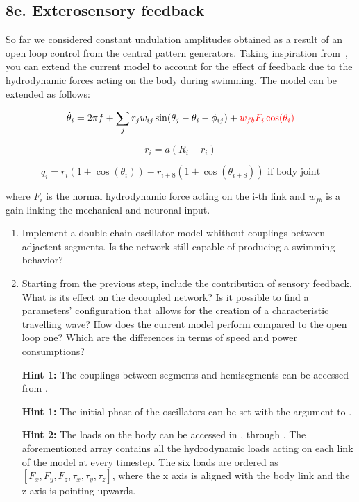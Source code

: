 \documentclass{cmc}
\begin{document}
\subsection*{8e. Exterosensory feedback}
\label{sec:exterosensory-feedback}

So far we considered constant undulation amplitudes obtained as a result
of an open loop control from the central pattern generators.
Taking inspiration from~\cite{thandiackal2021emergence}, you can extend the
current model to account for the effect of feedback due to the
hydrodynamic forces acting on the body during swimming.
The model can be extended as follows:

\begin{equation}
  \label{eq:dphase_fb}
  \dot{\theta}_i = 2 \pi f + \sum_j r_j w_{ij} \sin(\theta_j - \theta_i - \phi_{ij})
                  + \textcolor{red}{w_{fb} F_{i} \cos(\theta_i)}
\end{equation}

\begin{equation}
  \label{eq:dr_fb}
  \dot{r}_i = a (R_i - r_i)
\end{equation}

\begin{equation}
  \label{eq:output_fb}
  q_i = r_i(1 + \cos(\theta_i)) - r_{i+8}(1 + \cos(\theta_{i+8})) \text{ if body joint}
\end{equation}

where $ F_{i} $ is the normal hydrodynamic force acting on the i-th link and
$ w_{fb} $ is a gain linking the mechanical and neuronal input.

\begin{enumerate}
\item Implement a double chain oscillator model whithout couplings between
  adjactent segments. Is the network still capable of producing a swimming
  behavior?

\item Starting from the previous step, include the contribution of sensory
  feedback. What is its effect on the decoupled network? Is it possible to find
  a parameters' configuration that allows for the creation of a characteristic
  travelling wave? How does the current model perform compared to the
  open loop one?  Which are the differences in terms of speed and power
  consumptions?

\textbf{Hint 1:} The couplings between segments and hemisegments can be
  accessed from .

\textbf{Hint 1:} The initial phase of the oscillators can be
  set with the  argument to .

\textbf{Hint 2:} The loads on the body can be
  accessed in ,
  through .
  The aforementioned array contains all the hydrodynamic loads acting on
  each link of the model at every timestep. The six loads are ordered as
  $[ F_x, F_y, F_z, \tau_x, \tau_y, \tau_z ]$, where the x
  axis is aligned with the body link and the z axis is pointing upwards.

\end{enumerate}
\end{document}
